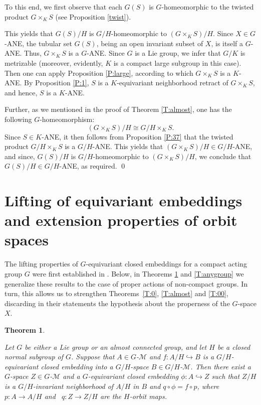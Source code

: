 \documentclass{amsart}
\newtheorem{theorem}{Theorem}[section]
\begin{document}
To this end, we first observe that  each $G(S)$ is $G$-homeomorphic to the twisted product $G\times_{K} S$ (see Proposition \ref{twist}). 

This yields that $G(S)/H$ is $G/H$-homeomorphic to 
$(G\times_ K S)/H$.
Since $X\in G$-{\rm ANE}, the tubular set  $G(S)$, being  an  open invariant subset of  $X$, is itself  a $G$-{\rm ANE}. Thus, $G\times_{K} S$ is a $G$-{\rm ANE}. Since $G$ is a Lie group, we infer that $G/K$ is   metrizable (moreover,
evidently, $K$ is a compact large subgroup in this case). Then one can apply Proposition \ref{P:large}, according to which 
$G\times_{K} S$ is a $K$-{\rm ANE}. 
By   Proposition \ref{P:1}, $S$ is a $K$-equivariant neighborhood retract of  $G\times_{K} S$, and hence,  $S$ is  a $K$-{\rm ANE}.


Further, as we mentioned in the proof of Theorem \ref{T:almost}, one has the  following $G$-homeomorphism: 
$$(G\times_K S)/H\cong G/H\times_ K S.$$
 Since $S\in K$-{\rm ANE},  it then follows from Proposition \ref{P:37}  that the twisted product $G/H\times_ K S$ is a $G/H$-{\rm ANE}. This yields that  $(G\times_ K S)/H\in G/H$-{\rm ANE}, and since, $G(S)/H$ is $G/H$-homeomorphic to 
$(G\times_ K S)/H$, we conclude that $G(S)/H\in G/H$-{\rm ANE}, as required.
 \qed
  
 
\medskip

\section{Lifting  of equivariant embeddings and extension properties of orbit spaces}\label{lifting}


The lifting properties of $G$-equivariant closed embeddings for a compact  acting group $G$ were first established in \cite{ant:preserv}.  Below, in  Theorems \ref{T:lifting1} and \ref{T:anygroup} 
we generalize these results to the case of proper actions of non-compact  groups.  In turn, this allows us  to strengthen  
 Theorems~\ref{T:0}, \ref{T:almost} and \ref{T:00},  discarding  in their statements the hypothesis about the properness of the $G$-space $X$.  




\begin{theorem}\label{T:lifting1} 

 Let   $G$ be either a Lie group or an almost connected  group, and let $H$ be  a closed  normal subgroup  of $G$. Suppose that    $A\in G$-$\mathcal M$ and
 $f:A/H\hookrightarrow  B$
 is a $G/H$-equivariant closed embedding into  a $G/H$-space  $B\in G/H$-$\mathcal M$. Then there exist
 a $G$-space  $Z\in G$-$\mathcal M$ and a $G$-equivariant closed embedding
 $\phi:A\hookrightarrow Z$
such that $Z/H$ is a  $G/H$-invariant neighborhood of $A/H$ in $B$
and $q\circ\phi=f\circ p$, where \ $p:A\to A/H$ and \  $q:Z\to
Z/H$ are the $H$-orbit maps.
\end{theorem}
\end{document}
